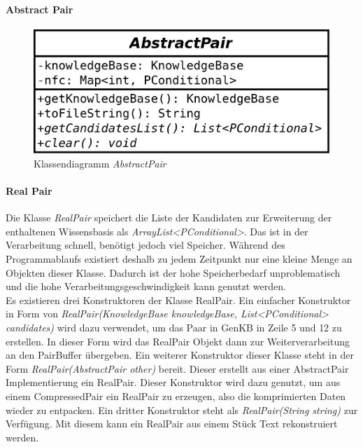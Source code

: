 \documentclass[12pt,a4paper]{article}
\begin{document}
\paragraph{Abstract Pair}\mbox{}
\label{sec:abstractpair}

\begin{figure}
\includegraphics[width=0.45\linewidth]{bilder/AbstractPair.png}
\caption{Klassendiagramm \textit{AbstractPair}}
\label{pic:abstractpair}
\end{figure}


\paragraph{Real Pair}\mbox{}
\label{sec:realpair}

Die Klasse \textit{RealPair} speichert die Liste der Kandidaten zur Erweiterung der enthaltenen Wissensbasis als \textit{ArrayList<PConditional>}. Das ist in der Verarbeitung schnell, benötigt jedoch viel Speicher. Während des Programmablaufs existiert deshalb zu jedem Zeitpunkt nur eine kleine Menge an Objekten dieser Klasse. Dadurch ist der hohe Speicherbedarf unproblematisch und die hohe Verarbeitungsgeschwindigkeit kann genutzt werden. \\
Es existieren drei Konstruktoren der Klasse RealPair. Ein einfacher Konstruktor in Form von \textit{RealPair(KnowledgeBase knowledgeBase, List<PConditional> candidates)} wird dazu verwendet, um das Paar in GenKB in Zeile 5 und 12 zu erstellen. In dieser Form wird das RealPair Objekt dann zur Weiterverarbeitung an den PairBuffer übergeben. Ein weiterer Konstruktor dieser Klasse steht in der Form \textit{RealPair(AbstractPair other)} bereit. Dieser erstellt aus einer AbstractPair Implementierung ein RealPair. Dieser Konstruktor wird dazu genutzt, um aus einem CompressedPair ein RealPair zu erzeugen, also die komprimierten Daten wieder zu entpacken. Ein dritter Konstruktor steht als \textit{RealPair(String string)} zur Verfügung. Mit diesem kann ein RealPair aus einem Stück Text rekonstruiert werden. 
\end{document}
